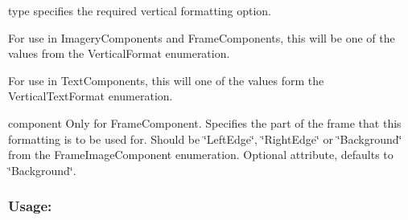 \begin{DoxyItemize}
\item {\ttfamily type} specifies the required vertical formatting option. 
\begin{DoxyItemize}
\item For use in Imagery\+Components and Frame\+Components, this will be one of the values from the Vertical\+Format enumeration. 
\item For use in Text\+Components, this will one of the values form the Vertical\+Text\+Format enumeration. 
\end{DoxyItemize}
\item {\ttfamily component} Only for Frame\+Component. Specifies the part of the frame that this formatting is to be used for. Should be \char`\"{}\+Left\+Edge\char`\"{}, \char`\"{}\+Right\+Edge\char`\"{} or \char`\"{}\+Background\char`\"{} from the Frame\+Image\+Component enumeration. Optional attribute, defaults to \char`\"{}\+Background\char`\"{}. 
\end{DoxyItemize}\hypertarget{fal_element_ref_fal_elem_ref_sec_36_3}{}\subsubsection{Usage\+:}\label{fal_element_ref_fal_elem_ref_sec_36_3}

